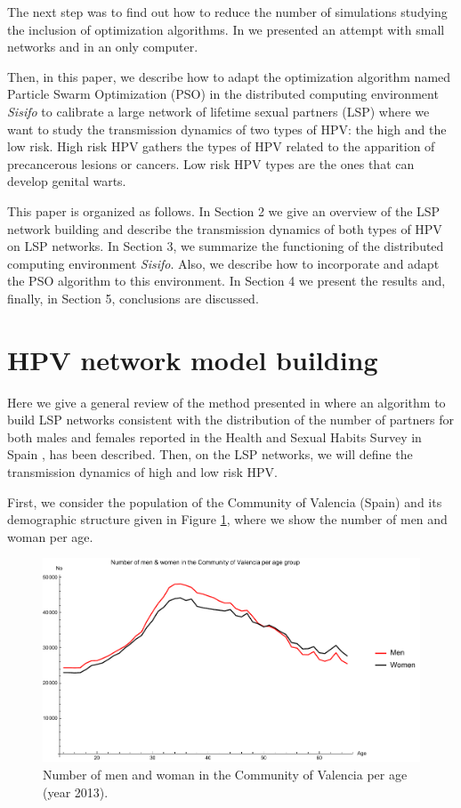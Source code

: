 The next step was to find out how to reduce the number of simulations studying the inclusion of optimization algorithms. In \cite{cortes2016modeling} we presented  an attempt with small networks and in an only computer. 

Then, in this paper, we describe how to adapt the optimization algorithm named Particle Swarm Optimization (PSO) in the distributed computing environment \textit{Sisifo} to calibrate a large network of lifetime sexual partners (LSP) where we want to study the transmission dynamics of two types of HPV: the high and the low risk. High risk HPV gathers the types of HPV related to the apparition of precancerous lesions or cancers. Low risk HPV types are the ones that can develop genital warts.

This paper is organized as follows. In Section 2 we give an overview of the LSP network building and describe the transmission dynamics of both types of HPV on LSP networks. In Section 3, we summarize the functioning of the distributed computing environment \textit{Sisifo}. Also, we describe how to incorporate and adapt the PSO algorithm to this environment. In Section 4 we present the results and, finally, in Section 5, conclusions are discussed.  

\section{HPV network model building}
Here we give a general review of the method presented in \cite{NOVA_LSP} where an algorithm to build LSP networks consistent with the distribution of the number of partners for both males and females reported in the Health and Sexual Habits Survey in Spain \cite{INE}, has been described. Then, on the LSP networks, we will define the transmission dynamics of high and low risk HPV.

First, we consider the population of the Community of Valencia (Spain) \cite{CV_wiki} and its demographic structure \cite{pegv} given in Figure \ref{demog}, where we show the number of men and woman per age.

\begin{figure}[h]
	\centering
	\includegraphics[scale=0.6]{demog.pdf}
	\caption{Number of men and woman in the Community of Valencia per age (year 2013).}
	\label{demog}
\end{figure}

